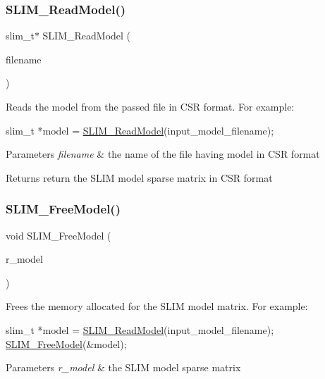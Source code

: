 \subsubsection{\texorpdfstring{S\+L\+I\+M\+\_\+\+Read\+Model()}{SLIM\_ReadModel()}}
{\footnotesize\ttfamily slim\+\_\+t$\ast$ S\+L\+I\+M\+\_\+\+Read\+Model (\begin{DoxyParamCaption}\item[{char $\ast$}]{filename }\end{DoxyParamCaption})}



Reads the model from the passed file in C\+SR format. For example\+: 


\begin{DoxyCode}
slim\_t *model = \hyperlink{group__slimapi_ga6ee60da1ee298e093723e9dfd9f21f1c}{SLIM\_ReadModel}(input\_model\_filename);
\end{DoxyCode}
 
\begin{DoxyParams}{Parameters}
{\em filename} & the name of the file having model in C\+SR format \\
\hline
\end{DoxyParams}
\begin{DoxyReturn}{Returns}
return the S\+L\+IM model sparse matrix in C\+SR format 
\end{DoxyReturn}
\mbox{\label{group__slimapi_ga2224ba0f1e06e728423bcf5c63da5fea}} 
\subsubsection{\texorpdfstring{S\+L\+I\+M\+\_\+\+Free\+Model()}{SLIM\_FreeModel()}}
{\footnotesize\ttfamily void S\+L\+I\+M\+\_\+\+Free\+Model (\begin{DoxyParamCaption}\item[{slim\+\_\+t $\ast$$\ast$}]{r\+\_\+model }\end{DoxyParamCaption})}



Frees the memory allocated for the S\+L\+IM model matrix. For example\+: 


\begin{DoxyCode}
slim\_t *model = \hyperlink{group__slimapi_ga6ee60da1ee298e093723e9dfd9f21f1c}{SLIM\_ReadModel}(input\_model\_filename);
\hyperlink{group__slimapi_ga2224ba0f1e06e728423bcf5c63da5fea}{SLIM\_FreeModel}(&model);
\end{DoxyCode}
 
\begin{DoxyParams}{Parameters}
{\em r\+\_\+model} & the S\+L\+IM model sparse matrix \\
\hline
\end{DoxyParams}
